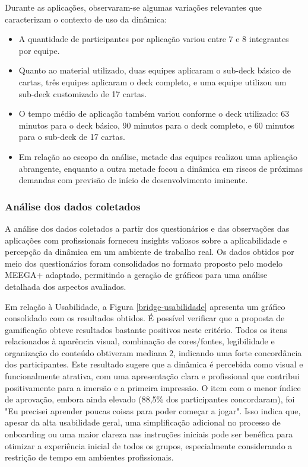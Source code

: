 \documentclass[
	12pt,
	openright,
	twoside,
	a4paper,
	english,
	brazil
	]{abntex2}
\begin{document}
Durante as aplicações, observaram-se algumas variações relevantes que caracterizam o contexto de uso da dinâmica:
\begin{itemize}
  \item A quantidade de participantes por aplicação variou entre 7 e 8 integrantes por equipe.
  \item Quanto ao material utilizado, duas equipes aplicaram o sub-deck básico de cartas, três equipes aplicaram o deck completo, e uma equipe utilizou um sub-deck customizado de 17 cartas.
  \item O tempo médio de aplicação também variou conforme o deck utilizado: 63 minutos para o deck básico, 90 minutos para o deck completo, e 60 minutos para o sub-deck de 17 cartas.
  \item Em relação ao escopo da análise, metade das equipes realizou uma aplicação abrangente, enquanto a outra metade focou a dinâmica em riscos de próximas demandas com previsão de início de desenvolvimento iminente.
\end{itemize}

\subsubsection{Análise dos dados coletados}

A análise dos dados coletados a partir dos questionários e das observações das aplicações com profissionais forneceu insights valiosos sobre a aplicabilidade e percepção da dinâmica em um ambiente de trabalho real. Os dados obtidos por meio dos questionários foram consolidados no formato proposto pelo modelo MEEGA+ adaptado, permitindo a geração de gráficos para uma análise detalhada dos aspectos avaliados.

Em relação à Usabilidade, a Figura \ref{bridge-usabilidade} apresenta um gráfico consolidado com os resultados obtidos. É possível verificar que a proposta de gamificação obteve resultados bastante positivos neste critério. Todos os itens relacionados à aparência visual, combinação de cores/fontes, legibilidade e organização do conteúdo obtiveram mediana 2, indicando uma forte concordância dos participantes. Este resultado sugere que a dinâmica é percebida como visual e funcionalmente atrativa, com uma apresentação clara e profissional que contribui positivamente para a imersão e a primeira impressão. O item com o menor índice de aprovação, embora ainda elevado (88,5\% dos participantes concordaram), foi "Eu precisei aprender poucas coisas para poder começar a jogar". Isso indica que, apesar da alta usabilidade geral, uma simplificação adicional no processo de onboarding ou uma maior clareza nas instruções iniciais pode ser benéfica para otimizar a experiência inicial de todos os grupos, especialmente considerando a restrição de tempo em ambientes profissionais.
\end{document}
